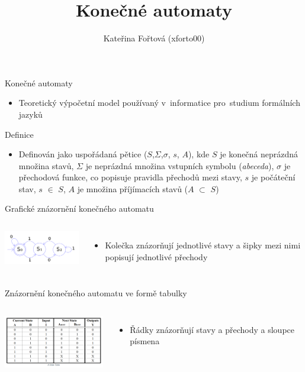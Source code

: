 \documentclass{beamer}
\title{Konečné automaty}
\author{Kateřina Fořtová (xforto00)}
\begin{document}
\begin{frame}
  \titlepage
\end{frame}

\begin{frame}{Konečné automaty}
  \begin{itemize}
  \item {Teoretický výpočetní model používaný v~informatice pro~studium formálních jazyků}
  \end{itemize}
  \pause
  \begin{alertblock}{Definice}
  \begin{itemize}
   \item{Definován jako uspořádaná pětice ($S$,$\Sigma$,$\sigma$, $s$, $A$), kde $S$ je konečná neprázdná množina stavů, $\Sigma$ je neprázdná množina vstupních symbolu (\textit{abeceda}), $\sigma$ je přechodová funkce, co popisuje pravidla přechodů mezi stavy, $s$ je počáteční stav, $s$ $\in$ $S$, $A$ je množina příjímacích stavů ($A$ $\subset$ $S$)}
  \end{itemize}
  \end{alertblock}
\end{frame}

\begin{frame}{Grafické znázornění konečného automatu}
  \begin{columns}
    \column{5cm}
      \includegraphics[width=5cm]{znazorneni.png}
    \column{5cm}
      \begin{itemize}
        \item{Kolečka znázorňují jednotlivé stavy a šipky mezi nimi popisují jednotlivé přechody}
      \end{itemize}
  \end{columns}
\end{frame}

\begin{frame}{Znázornění konečného automatu ve formě tabulky}
  \begin{columns}
    \column{5cm}
      \includegraphics[width=5cm]{statetable.PNG}
    \column{5cm}
      \begin{itemize}
        \item{Řádky znázorňují stavy a přechody a sloupce písmena}
      \end{itemize}
  \end{columns}
\end{frame}
\end{document}
